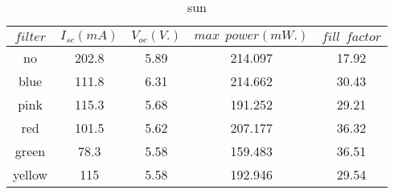 \begin{table}[h]

\caption{sun}
\begin{tabular}{|c|c|c|c|c|}
$filter$ & $I_{s c}(m A)$ & $V_{o c}(V.)$ & $max \ \ power(m W.)$ & $fill \ \ factor$    \\ \hline
no     & 202.8 & 5.89  & 214.097 & 17.92 \\
blue   & 111.8 & 6.31  & 214.662 & 30.43 \\
pink   & 115.3 & 5.68  & 191.252 & 29.21 \\
red    & 101.5 & 5.62  & 207.177 & 36.32 \\
green  & 78.3  & 5.58  & 159.483 & 36.51 \\
yellow & 115   & 5.58  & 192.946 & 29.54
\end{tabular}

\end{table}